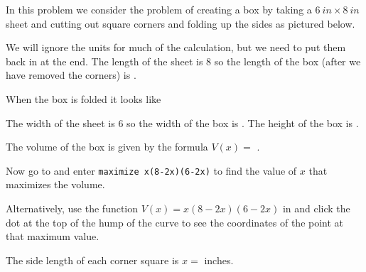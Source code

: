 \documentclass{ximera}
\begin{document}
\begin{question}
In this problem we consider the problem of creating a box by taking a $\SI{6}{in}\times\SI{8}{in}$ sheet and cutting out square corners and folding up the sides as pictured below.
\begin{image}
\end{image}
\begin{solution}
We will ignore the units for much of the calculation, but we need to put them back in at the end. The length of the sheet is $8$ so the length of the box (after we have removed the corners) is .
\begin{hint}
When the box is folded it looks like
\begin{image}
\end{image}
\end{hint}
The width of the sheet is $6$ so the width of the box is . The height of the box is .

The volume of the box is given by the formula $V(x)=$ .

Now go to  and enter \texttt{maximize x(8-2x)(6-2x)} to find the value of $x$ that maximizes the volume. 

Alternatively, use the function $V(x)=x(8-2x)(6-2x)$ in  and click the dot at the top of the hump of the curve to see the coordinates of the point at that maximum value.

The side length of each corner square is  $x=$  inches.
\end{solution}
\end{question}
\end{document}
